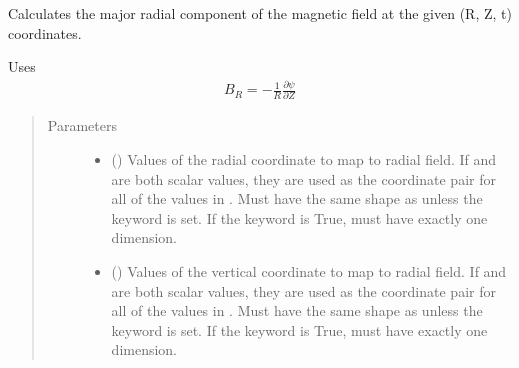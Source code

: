 \documentclass[letterpaper,10pt,english]{sphinxmanual}
\begin{document}
\begin{fulllineitems}
\begin{fulllineitems}
\begin{sphinxVerbatim}[commandchars=\\\{\}]
  \PYG{p}{[} \PYG{p}{]} \PYG{p}{[} \PYG{p}{]} 
\end{sphinxVerbatim}

\end{fulllineitems}


\begin{fulllineitems}
\label{\detokenize{eqtools:eqtools.core.Equilibrium.rz2BR}}
Calculates the major radial component of the magnetic field at the given (R, Z, t) coordinates.

Uses
\begin{equation*}
\begin{split}B_R = -\frac{1}{R}\frac{\partial \psi}{\partial Z}\end{split}
\end{equation*}\begin{quote}\begin{description}
\item[{Parameters}] \leavevmode\begin{itemize}
\item {} 
 () \textendash{} Values of the radial coordinate to
map to radial field. If  and  are both scalar values,
they are used as the coordinate pair for all of the values in
. Must have the same shape as  unless the 
keyword is set. If the  keyword is True,  must
have exactly one dimension.

\item {} 
 () \textendash{} Values of the vertical coordinate to
map to radial field. If  and  are both scalar values,
they are used as the coordinate pair for all of the values in
. Must have the same shape as  unless the 
keyword is set. If the  keyword is True,  must
have exactly one dimension.


\end{itemize}
\end{description}
\end{quote}
\end{fulllineitems}
\end{fulllineitems}
\end{document}
